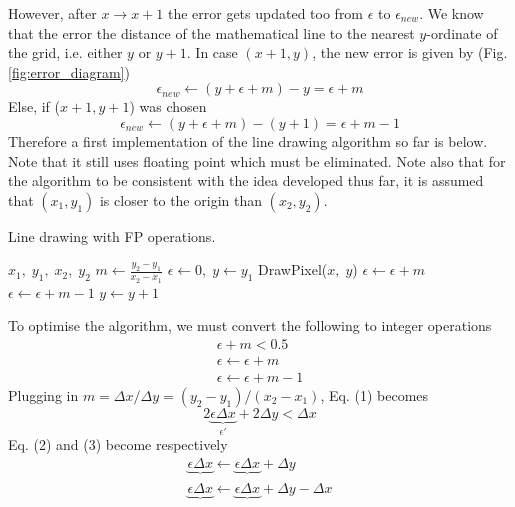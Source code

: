 \documentclass[a4paper]{article}
\begin{document}
However, after $x\rightarrow x+1$ the error gets updated too from $\epsilon$ to $\epsilon_{new}$. We know that the error the distance of the mathematical line to the nearest $y$-ordinate of the grid, i.e. either $y$ or $y+1$. In case $(x+1,y)$, the new error is given by \cite{mallinus} (Fig. \ref{fig:error_diagram})
\begin{equation}
	\epsilon_{new} \leftarrow (y+\epsilon + m) - y  = \epsilon + m
\end{equation}
Else, if ($x+1,y+1$) was chosen
\begin{equation}
	\epsilon_{new} \leftarrow (y+\epsilon + m) - (y+1) = \epsilon + m -1	
\end{equation}
Therefore a first implementation of the line drawing algorithm so far is below. Note that it still uses floating point which must be eliminated. Note also that for the algorithm to be consistent with the idea developed thus far, it is assumed that $(x_1,y_1)$ is closer to the origin than $(x_2,y_2)$.
\begin{algorithm}[H]
\caption{Line drawing with FP operations.}
\label{alg:line_drawing_fp}
\begin{algorithmic}[1]
 {$x_1,\; y_1,\; x_2,\; y_2$} 
	\State $m \leftarrow \frac{y_2-y_1}{x_2-x_1} $
	\State $\epsilon \leftarrow 0, \; y\leftarrow y_1$ 
	\State DrawPixel($x,\; y$)
		\State $\epsilon \leftarrow \epsilon + m$ 
	\Else
		\State $\epsilon \leftarrow \epsilon + m - 1$ 
		\State $y\leftarrow y + 1$
	\EndIf
\EndFor
\EndProcedure
\end{algorithmic}
\end{algorithm}
To optimise the algorithm, we must convert the following to integer operations
\begin{gather*}
\epsilon + m < 0.5 \tag{1}	\\
	\epsilon \leftarrow \epsilon + m \tag{2}\\
	\epsilon \leftarrow \epsilon + m - 1 \tag{3}
\end{gather*}
Plugging in $m=\Delta x/\Delta y = (y_2-y_1)/(x_2-x_1)$, Eq. (1) becomes
\[	
	2\underbrace{\epsilon\Delta x}_{\epsilon'}  + 2\Delta y < \Delta x \tag{1'}
\]
Eq. (2) and (3) become respectively
\begin{gather*}
	\underbrace{\epsilon\Delta x}_{} \leftarrow \underbrace{\epsilon \Delta x}_{} + \Delta y \tag{2'}\\
	\underbrace{\epsilon\Delta x}_{} \leftarrow \underbrace{\epsilon \Delta x}_{} + \Delta y - \Delta x \tag{3'}\\
\end{gather*}
\end{document}
